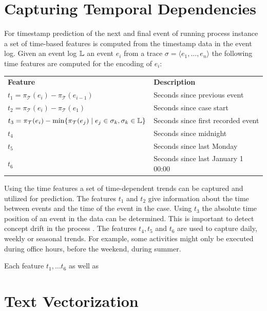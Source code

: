 \section{Capturing Temporal Dependencies}\label{sec:time}


For timestamp prediction of the next and final event of running process instance a set of time-based features is computed from the timestamp data in the event log.
Given an event log $\mathbb{L}$ an event $e_i$ from a trace $\sigma = \langle e_1, \dots, e_n \rangle$ the following time features are computed for the encoding of $e_i$: 

\begin{center}
\begin{tabularx}{\textwidth}{l l}
	\centering
	 \textbf{Feature} & \textbf{Description} \\
	$t_1 = \pi_\mathcal{T}(e_i) - \pi_\mathcal{T}(e_{i-1})$ & Seconds since previous event \\
	$t_2 = \pi_\mathcal{T}(e_i) - \pi_\mathcal{T}(e_1)$ & Seconds since case start \\
	$t_3 = \pi_\mathcal{T}(e_i) - \min\{\pi_\mathcal{T}(e_{j}) \mid  e_j \in \sigma_k, \sigma_k \in \mathbb{L}\}$ & Seconds since first recorded event \\
	$t_4$ & Seconds since midnight \\
	$t_5$ & Seconds since last Monday \\
	$t_6$ & Seconds since last January 1 00:00
\end{tabularx}
\end{center}

Using the time features a set of time-dependent trends can be captured and utilized for prediction.
The features $t_1$ and $t_2$ give information about the time between events and the time of the event in the case.
Using $t_3$ the absolute time position of an event in the data can be determined.
This is important to detect concept drift in the process \cite{DBLP:journals/tnn/BoseAZP14}.
The features $t_4, t_5$ and $t_6$ are used to capture daily, weekly or seasonal trends.
For example, some activities might only be executed during office hours, before the weekend, during summer.

Each feature $t_1, \dots t_6$ as well as 

\section{Text Vectorization}\label{sec:text}

